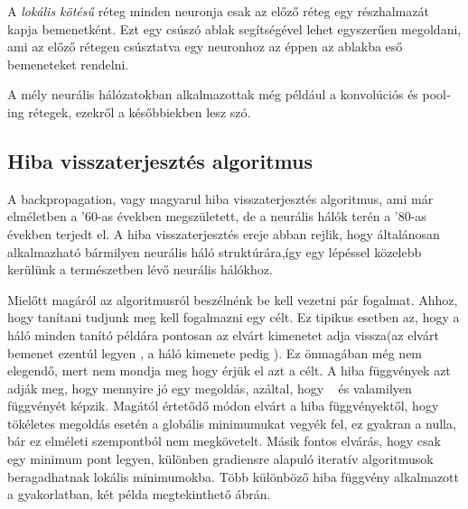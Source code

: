 A \emph{lokális kötésű} réteg minden neuronja csak az előző réteg egy részhalmazát kapja bemenetként. Ezt egy csúszó ablak segítségével lehet egyszerűen megoldani, ami az előző rétegen csúsztatva egy neuronhoz az éppen az ablakba eső bemeneteket rendelni.

A mély neurális hálózatokban alkalmazottak még például a konvolúciós és \foreignlanguage{english}{pooling} rétegek, ezekről a későbbiekben lesz szó.

\subsection{Hiba visszaterjesztés algoritmus}

A \foreignlanguage{english}{backpropagation}, vagy magyarul hiba visszaterjesztés algoritmus, ami már elméletben a '60-as években megszületett, de a neurális hálók terén a '80-as években terjedt el. A hiba visszaterjesztés ereje abban rejlik, hogy általánosan alkalmazható bármilyen neurális háló struktúrára,így egy lépéssel közelebb kerülünk a természetben lévő neurális hálókhoz.

Mielőtt magáról az algoritmusról beszélnénk be kell vezetni pár fogalmat. Ahhoz, hogy tanítani tudjunk meg kell fogalmazni egy célt. Ez tipikus esetben az, hogy a háló minden tanító példára pontosan az elvárt kimenetet adja vissza(az elvárt bemenet ezentúl legyen \y, a háló kimenete pedig \yvesszo). Ez önmagában még nem elegendő, mert nem mondja meg hogy érjük el azt a célt. A hiba függvények azt adják meg, hogy mennyire jó egy megoldás, azáltal, hogy \y ~ és \yvesszo valamilyen függvényét képzik. Magától értetődő módon elvárt a hiba függvényektől, hogy tökéletes megoldás esetén a globális minimumukat vegyék fel, ez gyakran a nulla, bár ez elméleti szempontból nem megkövetelt. Másik fontos elvárás, hogy csak egy minimum pont legyen, különben gradiensre alapuló iteratív algoritmusok beragadhatnak lokális minimumokba. 
Több különböző hiba függvény alkalmazott a gyakorlatban, két példa megtekinthető  ábrán.

